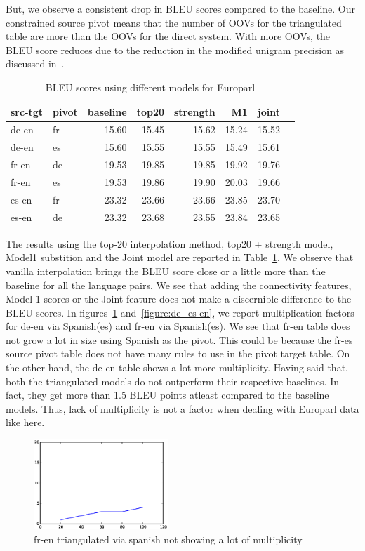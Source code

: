 	But, we observe a consistent drop in BLEU scores compared to the baseline. Our constrained source pivot means that the number of OOVs for the triangulated table are more than the OOVs for the direct system. With more OOVs, the BLEU score reduces due to the reduction in the modified unigram precision as discussed in~. 
	\begin{table}
	\begin{tabular}{llrrrrrr}
	\toprule
	src-tgt & pivot & baseline & top20 & strength & M1 & joint  \\
	\toprule
	de-en & fr & 15.60 & 15.45 & 15.62 & 15.24 & 15.52 \\
	de-en & es & 15.60 & 15.55 & 15.55 & 15.49 & 15.61  \\
	fr-en & de & 19.53 & 19.85 & 19.85 & 19.92 & 19.76  \\
	fr-en & es & 19.53 & 19.86 & 19.90 & 20.03 & 19.66  \\
	es-en & fr & 23.32 & 23.66 & 23.66 & 23.85 & 23.70  \\
	es-en & de & 23.32 & 23.68 & 23.55 & 23.84 & 23.65  \\
	\bottomrule
	\end{tabular}
	\centering
	\small
	\caption{BLEU scores using different models for Europarl}
	\label{table:eparlintertopn}
	\end{table}

	The results using the top-20 interpolation method, top20 + strength model, Model1 substition and the Joint model are reported in Table~\ref{table:eparlintertopn}. We observe that vanilla interpolation brings the BLEU score close or a little more than the baseline for all the language pairs. We see that adding the connectivity features, Model 1 scores or the Joint feature does not make a discernible difference to the BLEU scores. In figures~\ref{figure:fr_es_en} and~\ref{figure:de_es-en}, we report multiplication factors for de-en via Spanish(es) and fr-en via Spanish(es). We see that fr-en table does not grow a lot in size using Spanish as the pivot. This could be because the fr-es source pivot table does not have many rules to use in the pivot target table. On the other hand, the de-en table shows a lot more multiplicity. Having said that, both the triangulated models do not outperform their respective baselines. In fact, they get more than 1.5 BLEU points atleast compared to the baseline models. Thus, lack of multiplicity is not a factor when dealing with Europarl data like here. 
 
	\begin{figure}
		\small
		\centering
		\includegraphics[width=0.45\textwidth]{files/Tables/fr_es_en.eps}
		\caption{fr-en triangulated via spanish not showing  a lot of multiplicity}
		\label{figure:fr_es_en}
	\end{figure}

